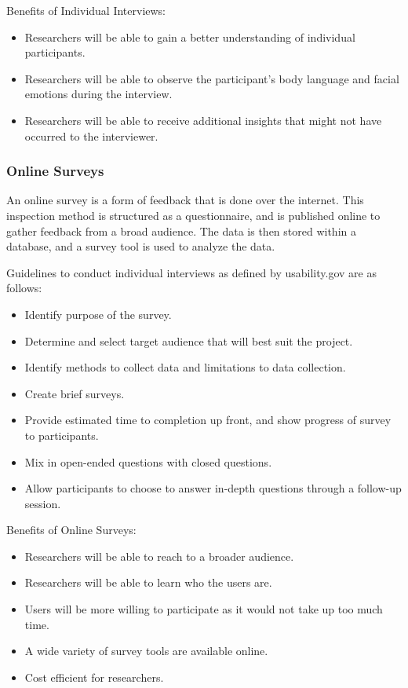 \documentclass[10pt,journal,compsoc,draftclsnofoot]{IEEEtran}
\begin{document}
Benefits of Individual Interviews:
\begin{itemize}
\item Researchers will be able to gain a better understanding of individual participants.
\item Researchers will be able to observe the participant's body language and facial emotions during the interview.
\item Researchers will be able to receive additional insights that might not have occurred to the interviewer.
\end{itemize}

\subsubsection{Online Surveys \cite{userResearch}} 
An online survey is a form of feedback that is done over the internet.
This inspection method is structured as a questionnaire, and is published online to gather feedback from a broad audience.
The data is then stored within a database, and a survey tool is used to analyze the data.

Guidelines to conduct individual interviews as defined by usability.gov are as follows:
\begin{itemize}
\item Identify purpose of the survey.
\item Determine and select target audience that will best suit the project.
\item Identify methods to collect data and limitations to data collection.
\item Create brief surveys.
\item Provide estimated time to completion up front, and show progress of survey to participants.
\item Mix in open-ended questions with closed questions.
\item Allow participants to choose to answer in-depth questions through a follow-up session.
\end{itemize}

Benefits of Online Surveys:
\begin{itemize}
\item Researchers will be able to reach to a broader audience.
\item Researchers will be able to learn who the users are.
\item Users will be more willing to participate as it would not take up too much time.
\item A wide variety of survey tools are available online.
\item Cost efficient for researchers.
\end{itemize}
\end{document}
